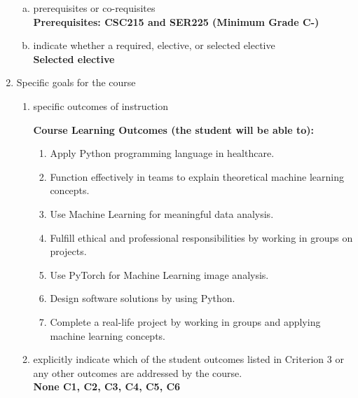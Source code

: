 \begin{enumerate}[1.]
\begin{enumerate}[a.]
\item prerequisites or co-requisites\\
  {\bfseries
    Prerequisites: CSC215 and SER225 (Minimum Grade C-)
  }

\item indicate whether a required, elective, or selected elective\\ %
  {\bfseries
    Selected elective
  }

\end{enumerate}

\item Specific goals for the course
\begin{enumerate}
\item specific outcomes of instruction\\ %
  {\bfseries
    Course Learning Outcomes (the student will be able to):
\begin{enumerate}
\item Apply Python programming language in healthcare.
\item Function effectively in teams to explain theoretical machine learning concepts.
\item Use Machine Learning for meaningful data analysis.
\item Fulfill ethical and professional responsibilities by working in groups on projects.
\item Use PyTorch for Machine Learning image analysis.
\item Design software solutions by using Python.
\item Complete a real-life project by working in groups and applying machine learning concepts.
\end{enumerate}
  }

\item explicitly indicate which of the student outcomes listed in Criterion 3 or any other outcomes are addressed by the course.\\
  {\bfseries
    None
    C1,
    C2,
    C3,
    C4,
    C5,
    C6
  }
\end{enumerate}


\end{enumerate}
